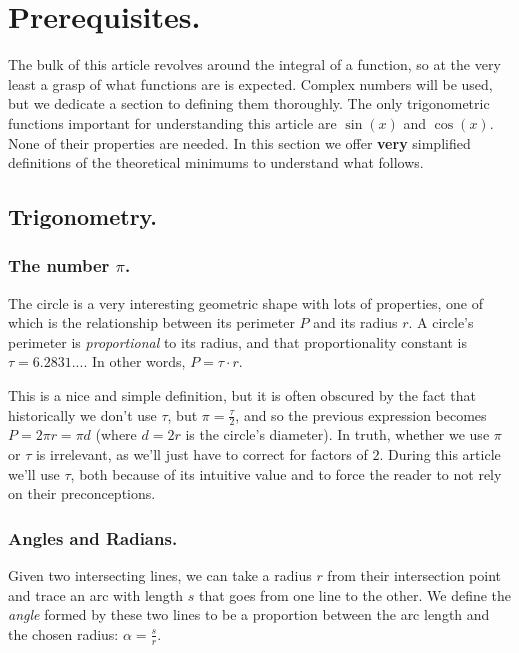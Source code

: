 \section{Prerequisites.}

The bulk of this article revolves around the integral of a function, so at the very least a grasp of what functions are is expected. Complex numbers will be used, but we dedicate a section to defining them thoroughly. The only trigonometric functions important for understanding this article are $\sin(x)$ and $\cos(x)$. None of their properties are needed. In this section we offer \textbf{very} simplified definitions of the theoretical minimums to understand what follows.

\subsection{Trigonometry.} \label{trig}

\subsubsection{The number $\pi$.}

The circle is a very interesting geometric shape with lots of properties, one of which is the relationship between its perimeter $P$ and its radius $r$. A circle's perimeter is \textit{proportional} to its radius, and that proportionality constant is $\tau = 6.2831...$. In other words, $P = \tau \cdot r$.

This is a nice and simple definition, but it is often obscured by the fact that historically we don't use $\tau$, but $\pi = \frac{\tau}{2}$, and so the previous expression becomes $P = 2 \pi r = \pi d$ (where $d = 2r$ is the circle's diameter). In truth, whether we use $\pi$ or $\tau$ is irrelevant, as we'll just have to correct for factors of $2$. During this article we'll use $\tau$, both because of its intuitive value and to force the reader to not rely on their preconceptions.

\subsubsection{Angles and Radians.}

Given two intersecting lines, we can take a radius $r$ from their intersection point and trace an arc with length $s$ that goes from one line to the other. We define the \textit{angle} formed by these two lines to be a proportion between the arc length and the chosen radius: $\alpha = \frac{s}{r}$.

